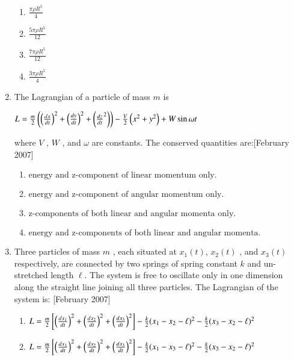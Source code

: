 \documentclass[journal]{IEEEtran}
\begin{document}
\begin{enumerate}
\begin{center}
\end{center}
\begin{enumerate}
\item $ \frac{\pi \rho R^5}{4} $
\item $ \frac{5\pi \rho R^5}{12} $
\item $ \frac{7\pi \rho R^5}{12} $
\item $ \frac{3\pi \rho R^5}{4}$
\end{enumerate}
\newpage
\item The Lagrangian of a particle of mass  $m$  is 
\begin{center}
$L = \frac{m}{2} \left( \left( \frac{dx}{dt} \right)^2 + \left( \frac{dy}{dt} \right)^2 + \left( \frac{dz}{dt}^2 \right) \right) - \frac{V}{2} \left( x^2 + y^2 \right) + W \sin \omega t $
\end{center}
where  $V$ ,  $W$ , and  $\omega$  are constants. The conserved quantities are:\hfill[February 2007]
\begin{enumerate}
\item $\text{energy and z-component of linear momentum only.}$
\item $ \text{energy and z-component of angular momentum only.} $
\item $\text{z-components of both linear and angular momenta only.} $
\item $ \text{energy and z-components of both linear and angular momenta.}$
\end{enumerate} 
\item Three particles of mass  $m$ , each situated at $ x_1(t) $,  $x_2(t)$ , and $ x_3(t)$  respectively, are connected by two springs of spring constant  $k$ and un-stretched length $ \ell $. The system is free to oscillate only in one dimension along the straight line joining all three particles. The Lagrangian of the system is: \hfill[February 2007]
\begin{enumerate}
\item $  L = \frac{m}{2} {}\left[ \left(\frac{dx_1}{dt}\right)^2 + \left( \frac{dx_2}{dt} \right)^2 + \left( \frac{dx_3}{dt} \right)^2\right] - \frac{k}{2} (x_1 - x_2 - \ell)^2 - \frac{k}{2} (x_3 - x_2 - \ell)^2$
\item $  L = \frac{m}{2} {}\left[ \left(\frac{dx_1}{dt}\right)^2 + \left( \frac{dx_2}{dt} \right)^2 + \left( \frac{dx_3}{dt} \right)^2\right] - \frac{k}{2} (x_1 - x_3 - \ell)^2 - \frac{k}{2} (x_3 - x_2 - \ell)^2$

\end{enumerate}
\end{enumerate}
\end{document}
